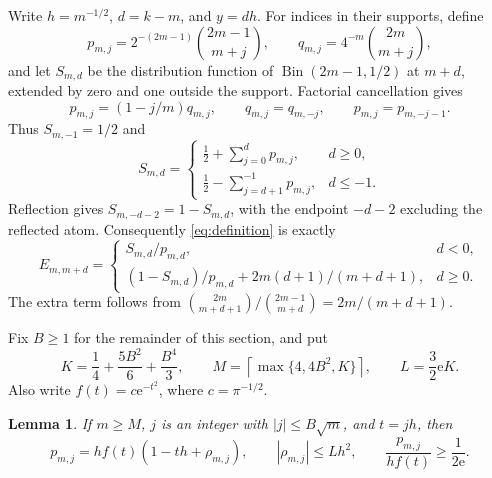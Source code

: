 \documentclass[11pt]{amsart}
\newtheorem{lemma}[theorem]{Lemma}
\newcommand{\ee}{\mathrm e}
\begin{document}
Write $h=m^{-1/2}$, $d=k-m$, and $y=dh$. For indices in their supports,
define
\[
 p_{m,j}=2^{-(2m-1)}\binom{2m-1}{m+j},
 \qquad q_{m,j}=4^{-m}\binom{2m}{m+j},
\]
and let $S_{m,d}$ be the distribution function of
$\operatorname{Bin}(2m-1,1/2)$ at $m+d$, extended by zero and one
outside the support. Factorial cancellation gives
\begin{equation}\label{eq:symmetry}
 p_{m,j}=(1-j/m)q_{m,j},\qquad
 q_{m,j}=q_{m,-j},\qquad p_{m,j}=p_{m,-j-1}.
\end{equation}
Thus $S_{m,-1}=1/2$ and
\begin{equation}\label{eq:signedcdf}
 S_{m,d}=
 \begin{cases}
 \displaystyle\frac12+\sum_{j=0}^{d}p_{m,j},&d\ge0,\\[4pt]
 \displaystyle\frac12-\sum_{j=d+1}^{-1}p_{m,j},&d\le-1.
 \end{cases}
\end{equation}
Reflection gives $S_{m,-d-2}=1-S_{m,d}$, with the endpoint $-d-2$
excluding the reflected atom. Consequently \eqref{eq:definition} is
exactly
\begin{equation}\label{eq:branches}
 E_{m,m+d}=
 \begin{cases}
 S_{m,d}/p_{m,d},&d<0,\\[2pt]
 (1-S_{m,d})/p_{m,d}+2m(d+1)/(m+d+1),&d\ge0.
 \end{cases}
\end{equation}
The extra term follows from
$\binom{2m}{m+d+1}/\binom{2m-1}{m+d}=2m/(m+d+1)$.

Fix $B\ge1$ for the remainder of this section, and put
\begin{equation}\label{eq:KM}
 K=\frac14+\frac{5B^2}{6}+\frac{B^4}{3},\qquad
 M=\left\lceil\max\{4,4B^2,K\}\right\rceil,\qquad
 L=\frac32\ee K.
\end{equation}
Also write $f(t)=c\ee^{-t^2}$, where $c=\pi^{-1/2}$.

\begin{lemma}\label{lem:local}
If $m\ge M$, $j$ is an integer with $|j|\le B\sqrt m$, and $t=jh$,
then
\begin{equation}\label{eq:local}
 p_{m,j}=hf(t)(1-th+\rho_{m,j}),\qquad
 |\rho_{m,j}|\le Lh^2,\qquad
 \frac{p_{m,j}}{hf(t)}\ge\frac1{2\ee}.
\end{equation}
\end{lemma}
\end{document}
